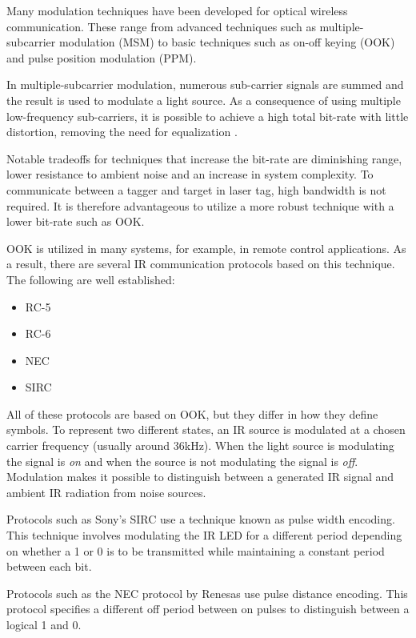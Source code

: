 Many modulation techniques have been developed for optical wireless communication. These range from advanced techniques such as multiple-subcarrier modulation (MSM) to basic techniques such as on-off keying (OOK) and pulse position modulation (PPM).

In multiple-subcarrier modulation, numerous sub-carrier signals are summed and the result is used to modulate a light source. As a consequence of using multiple low-frequency sub-carriers, it is possible to achieve a high total bit-rate with little distortion, removing the need for equalization \cite{Ohtsuki2003}.

Notable tradeoffs for techniques that increase the bit-rate are diminishing range, lower resistance to ambient noise and an increase in system complexity. To communicate between a tagger and target in laser tag, high bandwidth is not required. It is therefore advantageous to utilize a more robust technique with a lower bit-rate such as OOK.

OOK is utilized in many systems, for example, in remote control applications. As a result, there are several IR communication protocols based on this technique. The following are well established:

\begin{itemize}
	\item RC-5
	\item RC-6
	\item NEC
	\item SIRC
\end{itemize}

All of these protocols are based on OOK, but they differ in how they define symbols. To represent two different states, an IR source is modulated at a chosen carrier frequency (usually around 36kHz). When the light source is modulating the signal is \textit{on} and when the source is not modulating the signal is \textit{off}.  Modulation makes it possible to distinguish between a generated IR signal and ambient IR radiation from noise sources.

Protocols such as Sony's SIRC use a technique known as pulse width encoding. This technique involves modulating the IR LED for a different period depending on whether a 1 or 0 is to be transmitted while maintaining a constant period between each bit.

Protocols such as the NEC protocol by Renesas use pulse distance encoding. This protocol specifies a different off period between on pulses to distinguish between a logical 1 and 0.

